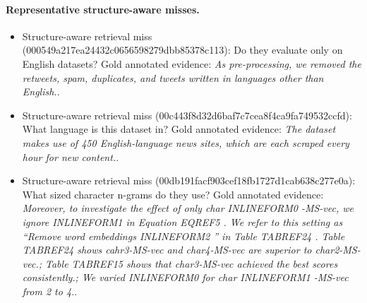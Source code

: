 \paragraph{Representative structure-aware misses.}
\begin{itemize}
\item Structure-aware retrieval miss (000549a217ea24432c0656598279dbb85378c113): Do they evaluate only on English datasets? Gold annotated evidence: \emph{As pre-processing, we removed the retweets, spam, duplicates, and tweets written in languages other than English.}.
\item Structure-aware retrieval miss (00c443f8d32d6baf7c7cea8f4ca9fa749532ccfd): What language is this dataset in? Gold annotated evidence: \emph{The dataset makes use of 450 English-language news sites, which are each scraped every hour for new content.}.
\item Structure-aware retrieval miss (00db191facf903cef18fb1727d1cab638c277e0a): What sized character n-grams do they use? Gold annotated evidence: \emph{Moreover, to investigate the effect of only char INLINEFORM0 -MS-vec, we ignore INLINEFORM1 in Equation EQREF5 . We refer to this setting as “Remove word embeddings INLINEFORM2 ” in Table TABREF24 . Table TABREF24 shows cahr3-MS-vec and char4-MS-vec are superior to char2-MS-vec.; Table TABREF15 shows that char3-MS-vec achieved the best scores consistently.; We varied INLINEFORM0 for char INLINEFORM1 -MS-vec from 2 to 4.}.
\end{itemize}

